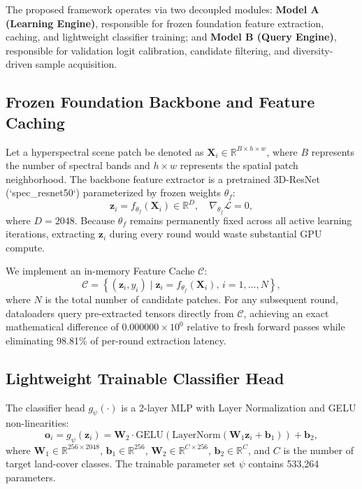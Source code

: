 \documentclass[conference,letterpaper]{IEEEtran}
\begin{document}
The proposed framework operates via two decoupled modules: \textbf{Model A (Learning Engine)}, responsible for frozen foundation feature extraction, caching, and lightweight classifier training; and \textbf{Model B (Query Engine)}, responsible for validation logit calibration, candidate filtering, and diversity-driven sample acquisition.

\subsection{Frozen Foundation Backbone and Feature Caching}
Let a hyperspectral scene patch be denoted as $\mathbf{X}_i \in \mathbb{R}^{B \times h \times w}$, where $B$ represents the number of spectral bands and $h \times w$ represents the spatial patch neighborhood. The backbone feature extractor is a pretrained 3D-ResNet (`spec\_resnet50`) parameterized by frozen weights $\theta_f$:
\begin{equation}
\mathbf{z}_i = f_{\theta_f}(\mathbf{X}_i) \in \mathbb{R}^{D}, \quad \nabla_{\theta_f} \mathcal{L} = 0,
\end{equation}
where $D = 2048$. Because $\theta_f$ remains permanently fixed across all active learning iterations, extracting $\mathbf{z}_i$ during every round would waste substantial GPU compute.

\vspace{0.3em}
We implement an in-memory Feature Cache $\mathcal{C}$:
\begin{equation}
\mathcal{C} = \left\{ (\mathbf{z}_i, y_i) \mid \mathbf{z}_i = f_{\theta_f}(\mathbf{X}_i), \, i = 1, \dots, N \right\},
\end{equation}
where $N$ is the total number of candidate patches. For any subsequent round, dataloaders query pre-extracted tensors directly from $\mathcal{C}$, achieving an exact mathematical difference of $0.000000\times 10^0$ relative to fresh forward passes while eliminating 98.81\% of per-round extraction latency.

\subsection{Lightweight Trainable Classifier Head}
The classifier head $g_{\psi}(\cdot)$ is a 2-layer MLP with Layer Normalization and GELU non-linearities:
\begin{equation}
\mathbf{o}_i = g_{\psi}(\mathbf{z}_i) = \mathbf{W}_2 \cdot \text{GELU}\left(\text{LayerNorm}(\mathbf{W}_1 \mathbf{z}_i + \mathbf{b}_1)\right) + \mathbf{b}_2,
\end{equation}
where $\mathbf{W}_1 \in \mathbb{R}^{256 \times 2048}$, $\mathbf{b}_1 \in \mathbb{R}^{256}$, $\mathbf{W}_2 \in \mathbb{R}^{C \times 256}$, $\mathbf{b}_2 \in \mathbb{R}^{C}$, and $C$ is the number of target land-cover classes. The trainable parameter set $\psi$ contains 533,264 parameters.
\end{document}
